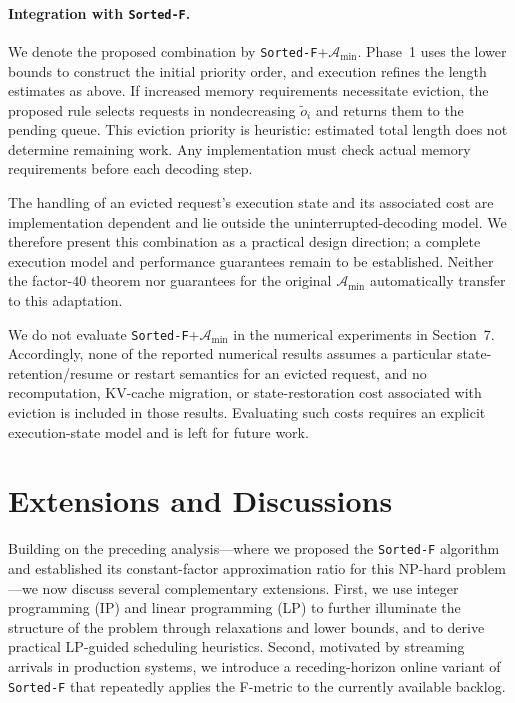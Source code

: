 \documentclass[nonblindrev]{informs3_hide}
\newcommand{\sortF}{\texttt{Sorted-F}}
\begin{document}
\paragraph{Integration with \sortF.}
We denote the proposed combination by \sortF{}+$\mathcal A_{\min}$. Phase~1 uses the lower bounds to construct the initial priority order, and execution refines the length estimates as above. If increased memory requirements necessitate eviction, the proposed rule selects requests in nondecreasing $\tilde o_i$ and returns them to the pending queue. This eviction priority is heuristic: estimated total length does not determine remaining work. Any implementation must check actual memory requirements before each decoding step.

The handling of an evicted request's execution state and its associated cost are implementation dependent and lie outside the uninterrupted-decoding model. We therefore present this combination as a practical design direction; a complete execution model and performance guarantees remain to be established. Neither the factor-$40$ theorem nor guarantees for the original $\mathcal A_{\min}$ automatically transfer to this adaptation.

We do not evaluate \sortF{}+$\mathcal A_{\min}$ in the numerical experiments in Section~7. Accordingly, none of the reported numerical results assumes a particular state-retention/resume or restart semantics for an evicted request, and no recomputation, KV-cache migration, or state-restoration cost associated with eviction is included in those results. Evaluating such costs requires an explicit execution-state model and is left for future work.


\section{Extensions and Discussions} \label{sec:extension}

Building on the preceding analysis---where we proposed the \sortF{} algorithm and established its constant-factor approximation ratio for this NP-hard problem---we now discuss several complementary extensions. First, we use integer programming (IP) and linear programming (LP) to further illuminate the structure of the problem through relaxations and lower bounds, and to derive practical LP-guided scheduling heuristics. Second, motivated by streaming arrivals in production systems, we introduce a receding-horizon online variant of \sortF{} that repeatedly applies the F-metric to the currently available backlog.
\end{document}

